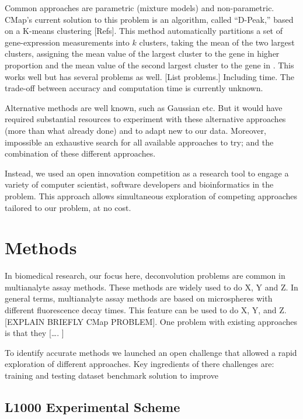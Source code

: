 \documentclass[]{article}
\begin{document}
Common approaches are parametric (mixture models) and non-parametric.
CMap's current solution to this problem is an algorithm, called
``D-Peak,'' based on a K-means clustering {[}Refs{]}. This method
automatically partitions a set of gene-expression measurements into
\(k\) clusters, taking the mean of the two largest clusters, assigning
the mean value of the largest cluster to the gene in higher proportion
and the mean value of the second largest cluster to the gene in . This
works well but has several problems as well. {[}List problems.{]}
Including time. The trade-off between accuracy and computation time is
currently unknown.

Alternative methods are well known, such as Gaussian etc. But it would
have required substantial resources to experiment with these alternative
approaches (more than what already done) and to adapt new to our data.
Moreover, impossible an exhaustive search for all available approaches
to try; and the combination of these different approaches.

Instead, we used an open innovation competition as a research tool to
engage a variety of computer scientist, software developers and
bioinformatics in the problem. This approach allows simultaneous
exploration of competing approaches tailored to our problem, at no cost.

\hypertarget{methods}{%
\section{Methods}\label{methods}}

In biomedical research, our focus here, deconvolution problems are
common in multianalyte assay methods. These methods are widely used to
do X, Y and Z. In general terms, multianalyte assay methods are based on
microspheres with different fluorescence decay times. This feature can
be used to do X, Y, and Z. {[}EXPLAIN BRIEFLY CMap PROBLEM{]}. One
problem with existing approaches is that they {[}\ldots{}. {]}

To identify accurate methods we launched an open challenge that allowed
a rapid exploration of different approaches. Key ingredients of there
challenges are: training and testing dataset benchmark solution to
improve

\hypertarget{l1000-experimental-scheme}{%
\subsection{L1000 Experimental Scheme}\label{l1000-experimental-scheme}}
\end{document}
